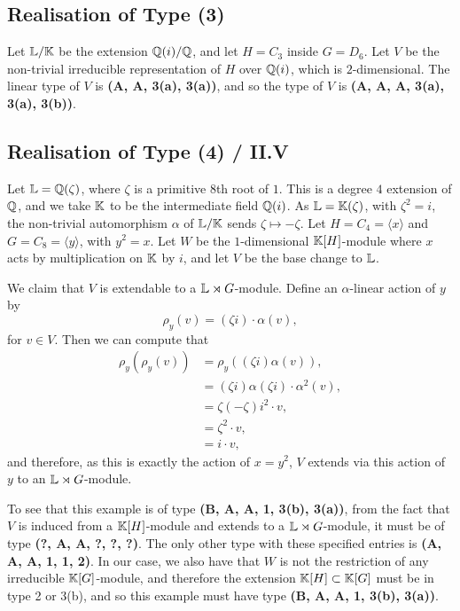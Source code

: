 \subsection{Realisation of Type (3)}

Let ${\mathbb L} / {\mathbb K}$ be the extension ${\mathbb Q}(i) / {\mathbb Q}$, and let $H = C_3$ inside $G = D_6$. Let $V$ be the non-trivial irreducible representation of $H$ over ${\mathbb Q}(i)$, which is $2$-dimensional. The linear type of $V$ is \textbf{(A, A, 3(a), 3(a))}, and so the type of $V$ is \textbf{(A, A, A, 3(a), 3(a), 3(b))}.

\subsection{Realisation of Type (4) / II.V}

Let ${\mathbb L} = {\mathbb Q}(\zeta)$, where $\zeta$ is a primitive $8$th root of $1$. This is a degree $4$ extension of ${\mathbb Q}$, and we take ${\mathbb K}$ to be the intermediate field ${\mathbb Q}(i)$. As ${\mathbb L} = {\mathbb K}(\zeta)$, with $\zeta^2 = i$, the non-trivial automorphism $\alpha$ of ${\mathbb L}/{\mathbb K}$ sends $\zeta \mapsto - \zeta$. Let $H = C_4 = \langle x \rangle$ and $G = C_8 = \langle y \rangle$, with $y^2 = x$. Let $W$ be the $1$-dimensional ${\mathbb K}[H]$-module where $x$ acts by multiplication on ${\mathbb K}$ by $i$, and let $V$ be the base change to ${\mathbb L}$.

We claim that $V$ is extendable to a ${\mathbb L} \rtimes G$-module. Define an $\alpha$-linear action of $y$ by
\[
    \rho_y(v) = (\zeta i) \cdot \alpha(v),
\]
for $v \in V$. Then we can compute that
\begin{align*}
\rho_y(\rho_y(v)) &= \rho_y((\zeta i)\alpha(v)), \\
&= (\zeta i) \alpha(\zeta i) \cdot \alpha^2(v), \\
&= \zeta (-\zeta) i^2 \cdot v, \\
&= \zeta^2 \cdot v, \\
&= i \cdot v,
\end{align*}
and therefore, as this is exactly the action of $x = y^2$, $V$ extends via this action of $y$ to an ${\mathbb L} \rtimes G$-module.

To see that this example is of type \textbf{(B, A, A, 1, 3(b), 3(a))}, from the fact that $V$ is induced from a ${\mathbb K}[H]$-module and extends to a ${\mathbb L} \rtimes G$-module, it must be of type \textbf{(?, A, A, ?, ?, ?)}. The only other type with these specified entries is \textbf{(A, A, A, 1, 1, 2)}. In our case, we also have that $W$ is not the restriction of any irreducible ${\mathbb K}[G]$-module, and therefore the extension ${\mathbb K}[H] \subset {\mathbb K}[G]$ must be in type 2 or 3(b), and so this example must have type \textbf{(B, A, A, 1, 3(b), 3(a))}.


